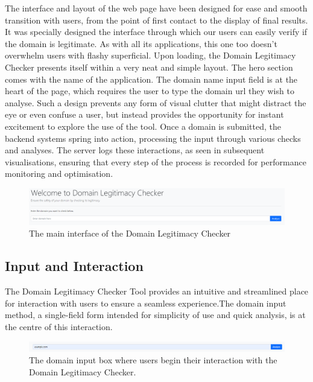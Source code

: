 The interface and layout of the web page have been designed for ease and smooth transition with users, from the point of first contact to the display of final results. It was specially designed the interface through which our users can easily verify if the domain is legitimate. As with all its applications, this one too doesn't overwhelm users with flashy superficial. Upon loading, the Domain Legitimacy Checker presents itself within a very neat and simple layout. The hero section comes with the name of the application. The domain name input field is at the heart of the page, which requires the user to type the domain url they wish to analyse. Such a design prevents any form of visual clutter that might distract the eye or even confuse a user, but instead provides the opportunity for instant excitement to explore the use of the tool. 
Once a domain is submitted, the backend systems spring into action, processing the input through various checks and analyses. The server logs these interactions, as seen in subsequent visualisations, ensuring that every step of the process is recorded for performance monitoring and optimisation.

\begin{figure}[H]
    \centering
    \includegraphics[width=1.1\linewidth]{project/image.png}
    \caption{The main interface of the Domain Legitimacy Checker}
    \label{fig:implem22}
\end{figure}

\subsection{Input and Interaction}

 The Domain Legitimacy Checker Tool provides an intuitive and streamlined place for interaction with users to ensure a seamless experience.The domain input method, a single-field form intended for simplicity of use and quick analysis, is at the centre of this interaction.
 
\begin{figure} [H]
    \centering
    \includegraphics[width=1.1\linewidth]{project/6.png}
    \caption{The domain input box where users begin their interaction with the Domain Legitimacy Checker.}
    \label{fig:impl2}
\end{figure}

